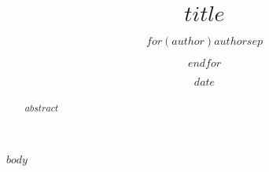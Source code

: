 \documentclass[a4paper,11pt, twocolumn]{article}
\begin{document}
\title{$title$}
\author{$for(author)$$author$$sep$\and $endfor$}
\date{$date$}
\maketitle



\begin{abstract}
$abstract$
\end{abstract}

$body$
\end{document}

